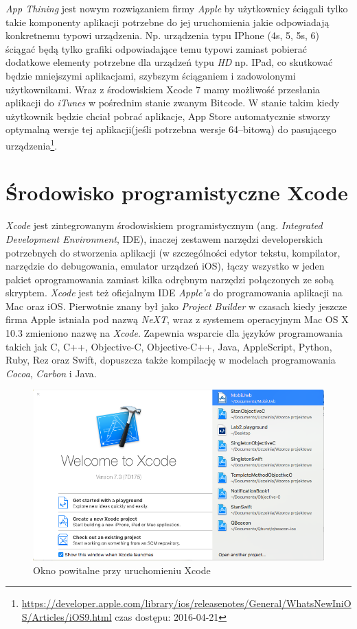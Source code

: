 \documentclass{iiuwb}
\begin{document}
\textit{App Thining} jest nowym rozwiązaniem firmy \textit{Apple} by użytkownicy ściągali tylko takie komponenty aplikacji potrzebne do jej uruchomienia jakie odpowiadają konkretnemu typowi urządzenia. Np. urządzenia typu IPhone (4s, 5, 5s, 6) ściągać będą tylko grafiki odpowiadające temu typowi zamiast pobierać dodatkowe elementy potrzebne dla urządzeń typu \textit{HD} np. IPad, co skutkować będzie mniejszymi aplikacjami, szybszym ściąganiem i zadowolonymi użytkownikami. Wraz z środowiskiem Xcode 7 mamy możliwość przesłania aplikacji do \textit{iTunes} w pośrednim stanie zwanym Bitcode. W stanie takim kiedy użytkownik będzie chciał pobrać aplikacje, App Store automatycznie stworzy optymalną wersje tej aplikacji(jeśli potrzebna wersje 64--bitową) do pasującego urządzenia\footnote{\url{https://developer.apple.com/library/ios/releasenotes/General/WhatsNewIniOS/Articles/iOS9.html} czas dostępu: 2016-04-21}. 


\section{Środowisko programistyczne Xcode}
\textit{Xcode} jest zintegrowanym środowiskiem programistycznym (ang. \textit{Integrated Development Environment}, IDE), inaczej zestawem narzędzi developerskich potrzebnych do stworzenia aplikacji (w szczególności edytor tekstu, kompilator, narzędzie do debugowania, emulator urządzeń iOS), łączy wszystko w jeden pakiet oprogramowania zamiast kilka odrębnym narzędzi połączonych ze sobą skryptem. \textit{Xcode} jest też oficjalnym IDE \textit{Apple'a} do programowania aplikacji na Mac oraz iOS. Pierwotnie znany był jako \textit{Project Builder} w czasach kiedy jeszcze firma Apple istniała pod nazwą \textit{NeXT}, wraz z systemem operacyjnym Mac OS X 10.3 zmieniono nazwę na \textit{Xcode}. Zapewnia wsparcie dla języków programowania takich jak C, C++, Objective-C, Objective-C++, Java, AppleScript, Python, Ruby, Rez oraz Swift, dopuszcza także kompilację w modelach programowania \textit{Cocoa}, \textit{Carbon} i Java.
\begin{figure}[!th]
\centering
\includegraphics[scale=.5]{image/XcodeOknoPowitalne.png}
\caption{Okno powitalne przy uruchomieniu Xcode}
\label{fig:XcodeOknoPowitalne}
\end{figure}
\end{document}
